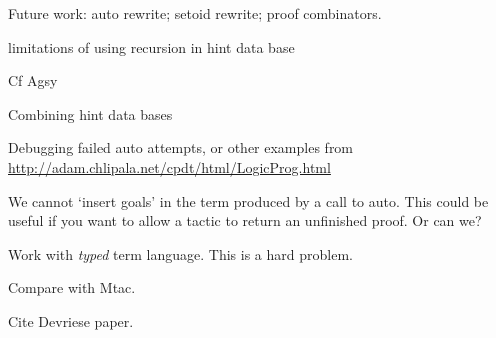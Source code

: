 \documentclass[preprint]{sigplanconf}
\begin{document}

Future work: auto rewrite; setoid rewrite; proof combinators.

limitations of using recursion in hint data base

Cf Agsy



Combining hint data bases

Debugging failed auto attempts, or other examples from
\url{http://adam.chlipala.net/cpdt/html/LogicProg.html}

We cannot `insert goals' in the term produced by a call to auto. This
could be useful if you want to allow a tactic to return an unfinished
proof. Or can we?

Work with \emph{typed} term language. This is a hard problem.

Compare with Mtac.

Cite Devriese paper.



\end{document}
